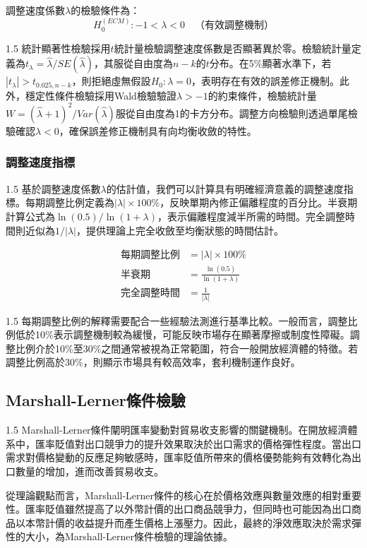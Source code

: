 \documentclass[a4paper,12pt]{article}
\begin{document}
調整速度係數$\lambda$的檢驗條件為：
\begin{equation}
H_0^{(ECM)}: -1 < \lambda < 0 \quad \text{（有效調整機制）} \label{eq:ecm_test}
\end{equation}
\begin{spacing}{1.5}
統計顯著性檢驗採用$t$統計量檢驗調整速度係數是否顯著異於零。檢驗統計量定義為$t_\lambda = \hat{\lambda}/SE(\hat{\lambda})$，其服從自由度為$n-k$的$t$分布。在5\%顯著水準下，若$|t_\lambda| > t_{0.025, n-k}$，則拒絕虛無假設$H_0: \lambda = 0$，表明存在有效的誤差修正機制。此外，穩定性條件檢驗採用Wald檢驗驗證$\lambda > -1$的約束條件，檢驗統計量$W = (\hat{\lambda} + 1)^2/Var(\hat{\lambda})$服從自由度為1的卡方分布。調整方向檢驗則透過單尾檢驗確認$\lambda < 0$，確保誤差修正機制具有向均衡收斂的特性。
\end{spacing}
\vspace{-0.5cm}
\subsubsection{調整速度指標}
\begin{spacing}{1.5}
基於調整速度係數$\lambda$的估計值，我們可以計算具有明確經濟意義的調整速度指標。每期調整比例定義為$|\lambda| \times 100\%$，反映單期內修正偏離程度的百分比。半衰期計算公式為$\ln(0.5)/\ln(1+\lambda)$，表示偏離程度減半所需的時間。完全調整時間則近似為$1/|\lambda|$，提供理論上完全收斂至均衡狀態的時間估計。
\end{spacing}
\vspace{-0.5cm}
\begin{align}
\text{每期調整比例} &= |\lambda| \times 100\% \\
\text{半衰期} &= \frac{\ln(0.5)}{\ln(1+\lambda)} \\
\text{完全調整時間} &= \frac{1}{|\lambda|} \label{eq:adjustment_metrics}
\end{align}
\begin{spacing}{1.5}
每期調整比例的解釋需要配合一些經驗法測進行基準比較。一般而言，調整比例低於10\%表示調整機制較為緩慢，可能反映市場存在顯著摩擦或制度性障礙。調整比例介於10\%至30\%之間通常被視為正常範圍，符合一般開放經濟體的特徵。若調整比例高於30\%，則顯示市場具有較高效率，套利機制運作良好。
\end{spacing}

\vspace{-0.5cm}

\subsection{Marshall-Lerner條件檢驗}
\begin{spacing}{1.5}
Marshall-Lerner條件闡明匯率變動對貿易收支影響的關鍵機制。在開放經濟體系中，匯率貶值對出口競爭力的提升效果取決於出口需求的價格彈性程度。當出口需求對價格變動的反應足夠敏感時，匯率貶值所帶來的價格優勢能夠有效轉化為出口數量的增加，進而改善貿易收支。

從理論觀點而言，Marshall-Lerner條件的核心在於價格效應與數量效應的相對重要性。匯率貶值雖然提高了以外幣計價的出口商品競爭力，但同時也可能因為出口商品以本幣計價的收益提升而產生價格上漲壓力。因此，最終的淨效應取決於需求彈性的大小，為Marshall-Lerner條件檢驗的理論依據。
\end{spacing}
\vspace{-0.5cm}
\end{document}
